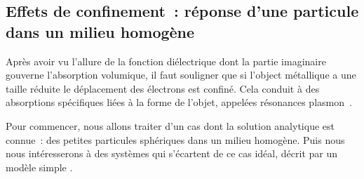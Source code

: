 	\subsection{Effets de confinement~: réponse d'une particule dans un milieu homogène}
Après avoir vu l'allure de la fonction diélectrique dont la partie imaginaire gouverne l'absorption volumique, il faut souligner que si l'object métallique a une taille réduite le déplacement des électrons est confiné. Cela conduit à des absorptions spécifiques liées à la forme de l'objet, appelées résonances plasmon~\cite{maier2007plasmonics,kreibigbook}.\par 
Pour commencer, nous allons traiter d'un cas dont la solution analytique est connue~: des petites particules sphériques dans un milieu homogène. Puis nous nous intéresserons à des systèmes qui s'écartent de ce cas idéal, décrit par un modèle \og simple \fg.\par 
